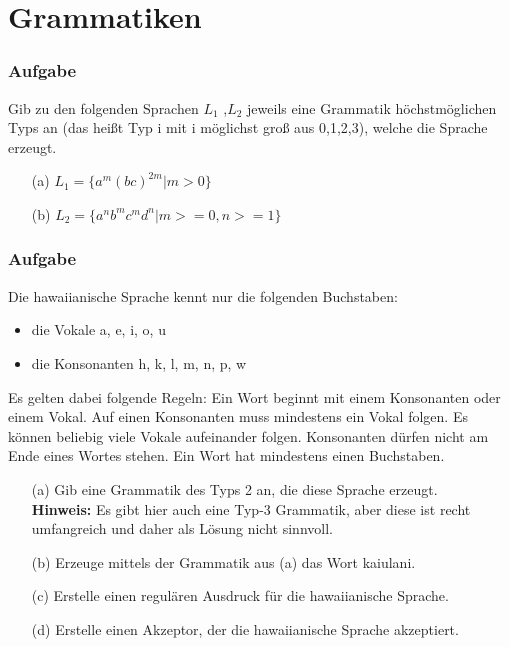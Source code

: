 \section{Grammatiken}
\begin{frame}
	\frametitle{Aufgabe}
	Gib zu den folgenden Sprachen $L_1$ ,$L_2$ jeweils eine Grammatik höchstmöglichen Typs 	an (das heißt Typ i mit i möglichst groß aus {0,1,2,3}), welche die Sprache erzeugt.
	\begin{enumerate}
		\item[(a)] $L_1=\{a^m (bc)^{2m}| m> 0 \}$
		\item[(b)] $L_2=\{a^n b^m c^m d^n | m>=0, n>=1 \}$
	\end{enumerate}
\end{frame}

\begin{frame}
	\frametitle{Aufgabe}
	Die hawaiianische Sprache kennt nur die folgenden Buchstaben:
	\begin{itemize}
		\item die Vokale a, e, i, o, u
		\item die Konsonanten h, k, l, m, n, p, w
	\end{itemize}
Es gelten dabei folgende Regeln:
Ein Wort beginnt mit einem Konsonanten oder einem Vokal. Auf einen Konsonanten muss
mindestens ein Vokal folgen. Es können beliebig viele Vokale aufeinander folgen. Konsonanten
dürfen nicht am Ende eines Wortes stehen. Ein Wort hat mindestens einen Buchstaben.
	\small
	\begin{enumerate}
		\item[(a)] Gib eine Grammatik des Typs 2 an, die diese Sprache erzeugt. \\
					\footnotesize
					\textbf{Hinweis:} Es gibt hier auch eine Typ-3 Grammatik, aber diese ist recht umfangreich und daher als Lösung nicht sinnvoll.
					\small
		\item[(b)] Erzeuge mittels der Grammatik aus (a) das Wort kaiulani.
		\item[(c)] Erstelle einen regulären Ausdruck für die hawaiianische Sprache.
		\item[(d)] Erstelle einen Akzeptor, der die hawaiianische Sprache akzeptiert.
	\end{enumerate}
\end{frame}

